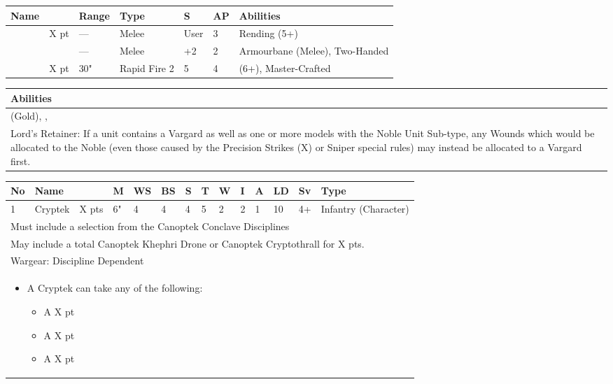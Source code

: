 \noindent
\begin{tabular}{||m{110pt} m{30pt} m{31pt} m{55pt} m{12pt} m{12pt} m{210pt}||}
	\hline
	Name & & Range & Type & S & AP & Abilities \\
	\hline
	\quickref{Hyperphase Sword} & X pt & — & Melee & User & 3 & Rending (5+) \\
	\quickref{Warscythe} & & — & Melee & +2 & 2 & Armourbane (Melee), Two-Handed \\
	\quickref{Relic Gauss Blaster} & X pt & 30" & Rapid Fire 2 & 5 & 4 & \quickref{Gauss} (6+), Master-Crafted \\	
	\hline
\end{tabular}

\noindent
\begin{tabular}{||m{532pt}||}
	\hline
	Abilities \\
	\hline
	\quickref{Awakening Protocols}(Gold), \quickref{Living Metal}, \quickref{Reanimation Protocols} \\
	Lord's Retainer: If a unit contains a Vargard as well as one or more models with the Noble Unit Sub-type, any Wounds which would be allocated to the Noble (even those caused by the Precision Strikes (X) or Sniper special rules) may instead	be allocated to a Vargard first. \\
	\hline
\end{tabular}


\newpage
{}

\noindent
\begin{tabular}{||m{10pt} m{95pt} m{30pt} m{11pt} m{11pt} m{11pt} m{11pt} m{11pt} m{11pt} m{11pt} m{11pt} m{11pt} m{11pt} m{125pt}||}
	\hline
	No & Name & & M & WS & BS & S & T & W & I & A & LD & Sv & Type \\
	\hline
	1 & Cryptek & X pts & 6" & 4 & 4 & 4 & 5 & 2 & 2 & 1 & 10 & 4+ & Infantry (Character)\\
	\hline
	\hline
	\multicolumn{14}{||Z{532 pt}||}{Must include a selection from the Canoptek Conclave Disciplines}\\
	\multicolumn{14}{||Z{532 pt}||}{May include a total Canoptek Khephri Drone or Canoptek Cryptothrall for X pts.}\\	
	\hline
	\hline
	\multicolumn{14}{||Z{532 pt}||}{Wargear: Discipline Dependent} \\		
	\multicolumn{14}{||Z{532 pt}||}{\begin{itemize}
			\item A Cryptek can take any of the following:
			\begin{itemize}
				\item A \quickref{Phase Shifter} \hrulefill X pt
				\item A \quickref{Phylactery} \hrulefill X pt
				\item A \quickref{Sempiternal Weave} \hrulefill X pt
			\end{itemize}
	\end{itemize}} \\	
	\hline
\end{tabular}

